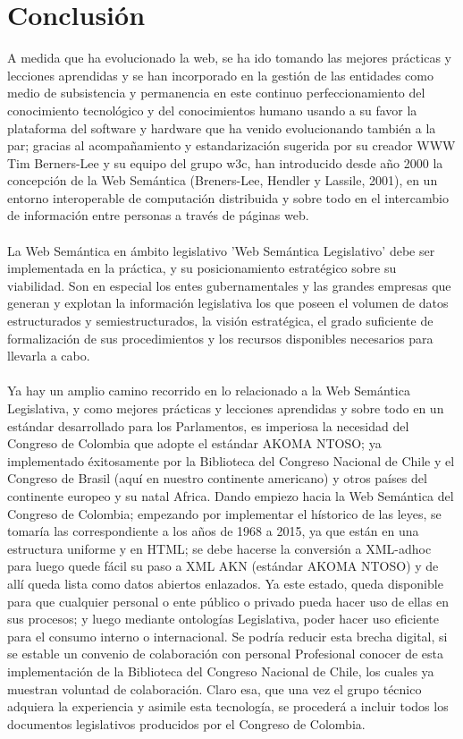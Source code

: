 \documentclass[conference]{IEEEtran}\usepackage[]{graphicx}\usepackage[]{color}
\begin{document}
\section{Conclusión}
A medida que ha evolucionado la web, se ha ido tomando las mejores prácticas y lecciones aprendidas y se han incorporado en la gestión de las entidades como medio de subsistencia y permanencia en este continuo perfeccionamiento del conocimiento tecnológico y del conocimientos humano usando a su favor la plataforma del software y hardware que ha venido evolucionando también a la par; gracias al acompañamiento y estandarización sugerida por su creador WWW Tim Berners-Lee y su equipo del grupo w3c, han introducido desde año 2000 la concepción de la Web Semántica (Breners-Lee, Hendler y Lassile, 2001), en un entorno interoperable de computación distribuida y sobre todo en el intercambio de información entre personas a través de páginas web. \\ \\
La Web Semántica en ámbito legislativo 'Web Semántica Legislativo' debe ser implementada en la práctica, y su posicionamiento estratégico sobre su viabilidad. Son en especial los entes gubernamentales y las grandes empresas que generan y explotan la información legislativa los que poseen el volumen de datos estructurados y semiestructurados, la visión estratégica, el grado suficiente de formalización de sus procedimientos y los recursos disponibles necesarios para llevarla a cabo. \\ \\
Ya hay un amplio camino recorrido en lo relacionado a la Web Semántica Legislativa, y como mejores prácticas y lecciones aprendidas y sobre todo en un estándar desarrollado para los Parlamentos, es imperiosa la necesidad del Congreso de Colombia que adopte el estándar AKOMA NTOSO; ya implementado éxitosamente por la Biblioteca del Congreso Nacional de Chile y el Congreso de Brasil (aquí en nuestro continente americano) y otros países del continente europeo y su natal Africa. Dando empiezo hacia la Web Semántica del Congreso de Colombia; empezando por implementar el hístorico de las leyes, se tomaría las correspondiente a los años de 1968 a 2015, ya que están en una estructura uniforme y en HTML; se debe hacerse la conversión a XML-adhoc para luego quede fácil su paso a XML AKN (estándar AKOMA NTOSO) y de allí queda lista como datos abiertos enlazados. Ya este estado, queda disponible para que cualquier personal o ente público o privado pueda hacer uso de ellas en sus procesos; y luego mediante ontologías Legislativa, poder hacer uso eficiente para el consumo interno o internacional. Se podría reducir esta brecha digital, si se estable un convenio de colaboración con personal Profesional conocer de esta implementación de la Biblioteca del Congreso Nacional de Chile, los cuales ya muestran voluntad de colaboración. Claro esa, que una vez el grupo técnico adquiera la experiencia y asimile esta tecnología, se procederá a incluir todos los documentos legislativos producidos por el Congreso de Colombia.
\end{document}
